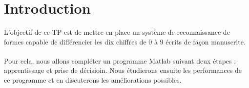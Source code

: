 \section{Introduction}

\paragraph{}
L'objectif de ce TP est de mettre en place un système de reconnaissance de formes capable de différencier les dix chiffres de 0 à 9 écrits de façon manuscrite. 

\paragraph{}
Pour cela, nous allons compléter un programme Matlab suivant deux étapes : apprentissage et prise de décisioin. Nous étudierons ensuite les performances de ce 
programme et en discuterons les améliorations possibles. 
